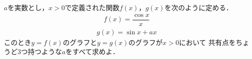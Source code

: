 \documentclass[../../main.tex]{subfiles}
\begin{document}
$a$を実数とし，$x>0$で定義された関数$f(x)$，$g(x)$を次のように定める．
\begin{align*}
  f(x)=\dfrac{\cos x}{x}
\end{align*}
\begin{align*}
  g(x)=\sin x+ax
\end{align*}
このとき$y=f(x)$のグラフと$y=g(x)$のグラフが$x>0$において
共有点をちょうど3つ持つような$a$をすべて求めよ．
\end{document}

